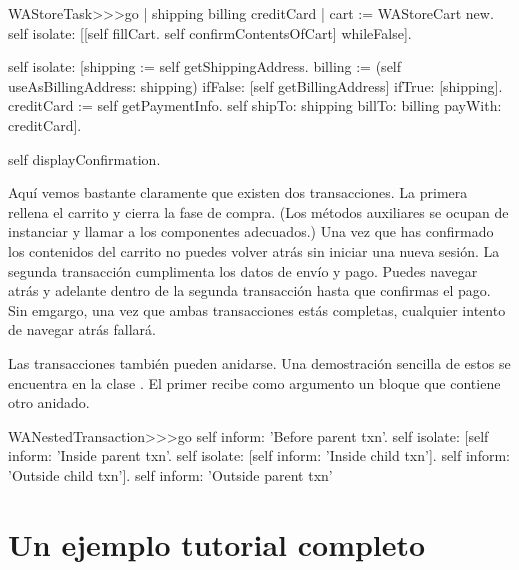 \documentclass[a4paper,10pt,twoside]{book}
\begin{document}
\begin{code}{}
WAStoreTask>>>go
	| shipping billing creditCard |
	cart := WAStoreCart new.
	self isolate:
		[[self fillCart.
		self confirmContentsOfCart]
			whileFalse].

	self isolate:
		[shipping := self getShippingAddress.
		billing := (self useAsBillingAddress: shipping)
					ifFalse: [self getBillingAddress]
					ifTrue: [shipping].
		creditCard := self getPaymentInfo.
		self shipTo: shipping billTo: billing payWith: creditCard].

	self displayConfirmation.
\end{code}

Aquí vemos bastante claramente que existen dos transacciones.
La primera rellena el carrito y cierra la fase de compra.
(Los métodos auxiliares  \etc se ocupan de instanciar y llamar a los componentes adecuados.)
Una vez que has confirmado los contenidos del carrito no puedes volver atrás sin iniciar una nueva sesión.
La segunda transacción cumplimenta los datos de envío y pago.
Puedes navegar atrás y adelante dentro de la segunda transacción hasta que confirmas el pago.
Sin emgargo, una vez que ambas transacciones estás completas, cualquier intento de navegar atrás fallará.

Las transacciones también pueden anidarse.
Una demostración sencilla de estos se encuentra en la clase .
El primer  recibe como argumento un bloque que contiene otro  anidado.

\begin{code}{}
WANestedTransaction>>>go
	self inform: 'Before parent txn'.
	self isolate:
			[self inform: 'Inside parent txn'.
			self isolate: [self inform: 'Inside child txn'].
			self inform: 'Outside child txn'].
	self inform: 'Outside parent txn'
\end{code}


\section{Un ejemplo tutorial completo}
\end{document}

